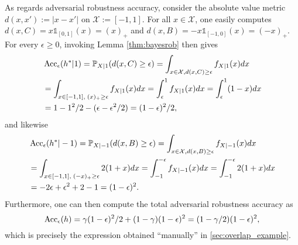 As regards adversarial robustness accuracy, consider  the absolute value metric
$d(x,x'):=|x-x'|$ on $\mathcal X:=[-1,1]$. For all $x \in \mathcal X$, one
easily computes $d(x,C)=x\mathbb
1_{[0,1]}(x)=(x)_+$ and $d(x,B)=-x\mathbb 1_{[-1, 0]}(x)=(-x)_+$.
For every $\epsilon \ge 0$, invoking Lemma \ref{thm:bayesrob} then gives 
\begin{eqnarray*}
  \begin{split}
    &\operatorname{Acc}_\epsilon(h^*|1)=\mathbb P_{X|1}(d(x,C) \ge \epsilon)=\int_{x \in \mathcal X,
      d(x,C)\ge\epsilon}f_{X|1}(x)dx\\
    &=\int_{x \in [-1, 1],\;(x)_+\ge\epsilon}f_{X|1}(x)dx
    =\int_{\epsilon}^1f_{X|1}(x)dx=\int_{\epsilon}^1(1-x)dx\\
    &=1-1^2/2 - (\epsilon - \epsilon^2/2)= (1-\epsilon)^2/2,
\end{split}
  \end{eqnarray*}
and likewise
\begin{eqnarray*}
  \begin{split}  
    &\operatorname{Acc}_\epsilon(h^*|-1)=\mathbb P_{X|-1}(d(x,B) \ge \epsilon)=\int_{x \in
      \mathcal X, d(x,B)\ge\epsilon}f_{X|-1}(x)dx\\
    &=\int_{x \in [-1, 1],\;(-x)_+\ge\epsilon}2(1+x)dx
    =\int_{-1}^{-\epsilon}f_{X|-1}(x)dx=\int_{-1}^{-\epsilon}2(1+x)dx\\
    &= -2\epsilon+\epsilon^2+2-1 = (1-\epsilon)^2.
\end{split}
\end{eqnarray*}
Furthermore, one can then compute the total adversarial robustness accuracy as
$$\operatorname{Acc}_\epsilon(h)=\gamma(1-\epsilon)^2/2 + (1  - \gamma)(1-\epsilon)^2
=(1-\gamma/2)(1-\epsilon)^2,
$$
which is precisely the expression obtained ``manually'' in
\ref{sec:overlap_example}.

